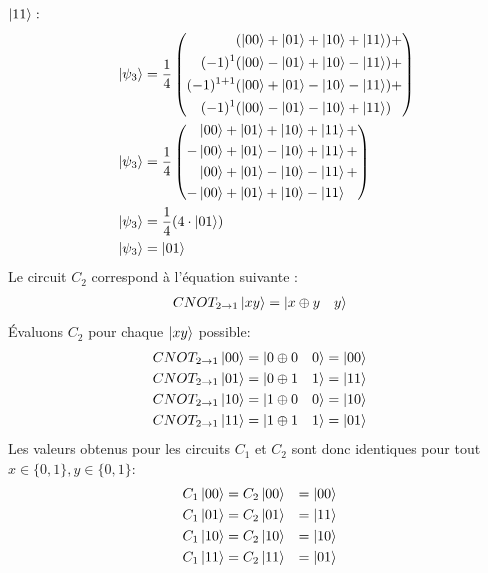 \documentclass{article}
\begin{document}
$\ket{11}:$ \\
\begin{align*}
&&      \ket{\psi_3} &= \frac{1}{4}\left(
        \begin{aligned}
                 &(\ket{00} + \ket{01} + \ket{10} + \ket{11}) + \\
          (-1)^1 &(\ket{00} - \ket{01} + \ket{10} - \ket{11}) + \\
    (-1)^{1 + 1} &(\ket{00} + \ket{01} - \ket{10} - \ket{11}) + \\
          (-1)^1 &(\ket{00} - \ket{01} - \ket{10} + \ket{11}) \\
        \end{aligned}
    \right) \\
&&      \ket{\psi_3} &= \frac{1}{4}\left(
        \begin{aligned}
                 &\ket{00} + \ket{01} + \ket{10} + \ket{11} + \\
                -&\ket{00} + \ket{01} - \ket{10} + \ket{11} + \\
                 &\ket{00} + \ket{01} - \ket{10} - \ket{11} + \\
                -&\ket{00} + \ket{01} + \ket{10} - \ket{11} \\
        \end{aligned}
    \right) \\
&&      \ket{\psi_3} &= \frac{1}{4}(4 \cdot \ket{01}) \\
&&      \ket{\psi_3} &= \ket{01} \\
\end{align*}
Le circuit $C_2$ correspond à l'équation suivante : \\
\begin{align*} CNOT_{2 \rightarrow 1}\ket{xy} = \ket{x \oplus y \quad y} \end{align*}
\newpage
Évaluons $C_2$ pour chaque $\ket{xy}$ possible:
\begin{align*}
CNOT_{2 \rightarrow 1}\ket{00} &= \ket{0 \oplus 0 \quad 0} = \ket{00} \\
CNOT_{2 \rightarrow 1}\ket{01} &= \ket{0 \oplus 1 \quad 1} = \ket{11} \\ 
CNOT_{2 \rightarrow 1}\ket{10} &= \ket{1 \oplus 0 \quad 0} = \ket{10} \\ 
CNOT_{2 \rightarrow 1}\ket{11} &= \ket{1 \oplus 1 \quad 1} = \ket{01} \\
\end{align*}
Les valeurs obtenus pour les circuits $C_1$ et $C_2$ sont donc identiques pour tout $x \in \{0,1\}, y \in \{0, 1\}$: \\
\begin{align*}
C_1\ket{00} &= C_2 \ket{00} &= \ket{00} \\
C_1\ket{01} &= C_2 \ket{01} &= \ket{11} \\
C_1\ket{10} &= C_2 \ket{10} &= \ket{10} \\ 
C_1\ket{11} &= C_2 \ket{11} &= \ket{01} \\
\end{align*}
\end{document}
